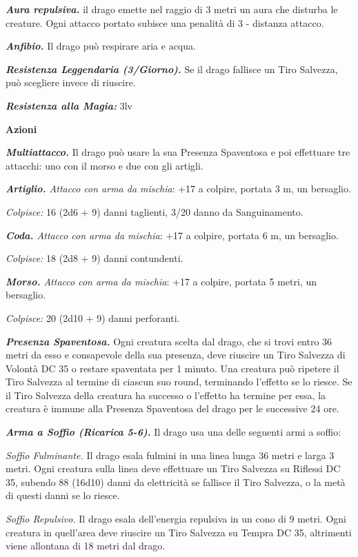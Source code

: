 \begin{multicols}{2}
{\emph{\textbf{Aura repulsiva.}} il drago emette nel raggio di 3 metri un aura che disturba le creature. Ogni attacco portato subisce una penalità di 3 - distanza attacco.

\emph{\textbf{Anfibio.}} Il drago può respirare aria e acqua.

\emph{\textbf{Resistenza Leggendaria (3/Giorno).}} Se il drago fallisce un Tiro Salvezza, può scegliere invece di riuscire.

\emph{\textbf{Resistenza alla Magia:}} 3lv

\textbf{Azioni}

\emph{\textbf{Multiattacco.}} Il drago può usare la sua Presenza Spaventosa e poi effettuare tre attacchi: uno con il morso e due con gli artigli.

\emph{\textbf{Artiglio.} Attacco con arma da mischia}: +17 a colpire, portata 3 m, un bersaglio.

\emph{Colpisce:} 16 (2d6 + 9) danni taglienti, 3/20 danno da Sanguinamento.

\emph{\textbf{Coda.} Attacco con arma da mischia}: +17 a colpire, portata 6 m, un bersaglio.

\emph{Colpisce:} 18 (2d8 + 9) danni contundenti.

\emph{\textbf{Morso.} Attacco con arma da mischia}: +17 a colpire, portata 5 metri, un bersaglio.

\emph{Colpisce:} 20 (2d10 + 9) danni perforanti.

\emph{\textbf{Presenza Spaventosa.}} Ogni creatura scelta dal drago, che si trovi entro 36 metri da esso e consapevole della sua presenza, deve riuscire un Tiro Salvezza di Volontà DC 35 o restare spaventata per 1 minuto. Una creatura può ripetere il Tiro Salvezza al termine di ciascun suo round, terminando l'effetto se lo riesce. Se il Tiro Salvezza della creatura ha successo o l'effetto ha termine per essa, la creatura è immune alla Presenza Spaventosa del drago per le successive 24 ore.

\emph{\textbf{Arma a Soffio (Ricarica 5-6).}} Il drago usa una delle seguenti armi a soffio:

\emph{Soffio Fulminante.} Il drago esala fulmini in una linea lunga 36 metri e larga 3 metri. Ogni creatura sulla linea deve effettuare un Tiro Salvezza su Riflessi DC 35, subendo 88 (16d10) danni da elettricità se fallisce il Tiro Salvezza, o la metà di questi danni se lo riesce.

\emph{Soffio Repulsivo.} Il drago esala dell'energia repulsiva in un cono di 9 metri. Ogni creatura in quell'area deve riuscire un Tiro Salvezza su Tempra DC 35, altrimenti viene allontana di 18 metri dal drago.

}
\end{multicols}
